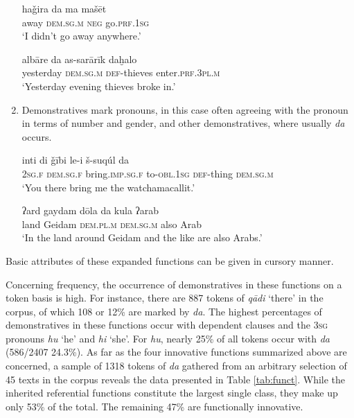 \documentclass[output=paper]{langsci/langscibook}
\begin{document}
\begin{enumerate}[leftmargin=*]
\ea\label{hajira}
\gll haǧira da ma mašēt\\
     away \textsc{dem.sg.m} \textsc{neg} go.\textsc{prf.1sg}\\
\glt ‘I didn’t go away anywhere.’
\z

\ea\label{albare}
\gll albāre da as-sarārīk daḫalo\\
     yesterday \textsc{dem.sg.m} \textsc{def-}thieves enter.\textsc{prf.3pl.m}\\
\glt ‘Yesterday evening thieves broke in.’
\z

\item Demonstratives mark pronouns, in this case often agreeing with the pronoun in terms of number and {gender}, and other {demonstratives}, where usually \textit{da} occurs.

\ea\label{suqul}
\ea
\gll inti di ǧībi le-i š-suqúl da\\
     \textsc{2sg.f} \textsc{dem.sg.f} bring.\textsc{imp.sg.f} to-\textsc{obl.1sg} \textsc{def-}thing \textsc{dem.sg.m}\\
\glt ‘You there bring me the watchamacallit.’
\z

\ea\label{ard}
\gll ʔard gaydam dōla da kula ʔarab\\
     land Geidam \textsc{dem.pl.m} \textsc{dem.sg.m} also Arab\\
\glt ‘In the land around Geidam and the like are also Arabs.’
\z
\z

\end{enumerate}

\noindent Basic attributes of these expanded functions can be given in cursory manner.

Concerning {frequency}, the occurrence of {demonstratives} in these functions on a token basis is high. For instance, there are 887 tokens of \textit{qādi} ‘there’ in the corpus, of which 108 or 12\% are marked by \textit{da}. The highest percentages of {demonstratives} in these functions occur with dependent clauses and the 3\textsc{sg} pronouns \textit{hu} ‘he’ and \textit{hi} ‘she’. For \textit{hu}, nearly 25\% of all tokens occur with \textit{da} (586/2407 24.3\%). As far as the four innovative functions summarized above are concerned, a sample of 1318 tokens of \textit{da} gathered from an arbitrary selection of 45 texts in the corpus reveals the data presented in Table \ref{tab:funct}. While the inherited referential functions constitute the largest single class, they make up only 53\% of the total. The remaining 47\% are functionally innovative.
\end{document}
